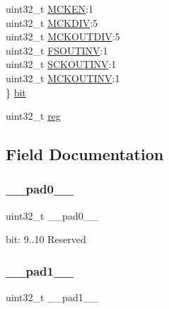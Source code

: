 \begin{DoxyCompactItemize}
\begin{tabbing}
\>uint32\_t \mbox{\hyperlink{union_i2_s___c_l_k_c_t_r_l___type_a151947f2f9dad4b244563d6072ab06f9}{MCKEN}}:1\\
\>uint32\_t \mbox{\hyperlink{union_i2_s___c_l_k_c_t_r_l___type_a998cd66686b5289fd64600a5f768d5eb}{MCKDIV}}:5\\
\>uint32\_t \mbox{\hyperlink{union_i2_s___c_l_k_c_t_r_l___type_abf38bad942c16764a302440bb4836da4}{MCKOUTDIV}}:5\\
\>uint32\_t \mbox{\hyperlink{union_i2_s___c_l_k_c_t_r_l___type_ab36d924f1665521e16018a6cc4928b43}{FSOUTINV}}:1\\
\>uint32\_t \mbox{\hyperlink{union_i2_s___c_l_k_c_t_r_l___type_a4dea2b011beabae3f973b59fa4d2020c}{SCKOUTINV}}:1\\
\>uint32\_t \mbox{\hyperlink{union_i2_s___c_l_k_c_t_r_l___type_aa8502e17ef2442920aa711c4464ef2f2}{MCKOUTINV}}:1\\
\} \mbox{\hyperlink{union_i2_s___c_l_k_c_t_r_l___type_a46990c13be898f984836da74e9cbbf1c}{bit}}\\

\end{tabbing}\item 
uint32\+\_\+t \mbox{\hyperlink{union_i2_s___c_l_k_c_t_r_l___type_a6b91636401516a477989a336376d7b40}{reg}}
\end{DoxyCompactItemize}


\subsection{Field Documentation}
\mbox{\label{union_i2_s___c_l_k_c_t_r_l___type_a3e57c2ef1c3ffb36722f000cc1156824}} 
\subsubsection{\texorpdfstring{\_\_pad0\_\_}{\_\_pad0\_\_}}
{\footnotesize\ttfamily uint32\+\_\+t \+\_\+\+\_\+pad0\+\_\+\+\_\+}

bit\+: 9..10 Reserved \mbox{\label{union_i2_s___c_l_k_c_t_r_l___type_a6712ba6dd1d5b43d2d56ff8ac4e275a7}} 
\subsubsection{\texorpdfstring{\_\_pad1\_\_}{\_\_pad1\_\_}}
{\footnotesize\ttfamily uint32\+\_\+t \+\_\+\+\_\+pad1\+\_\+\+\_\+}

